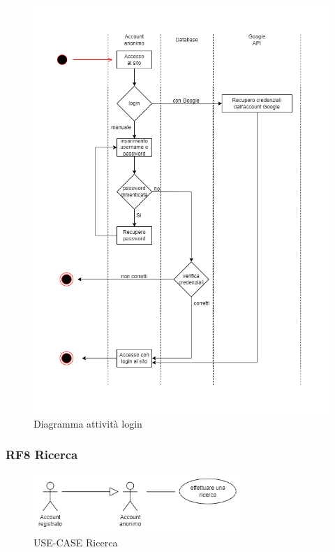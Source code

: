 \documentclass[a4paper,12pt]{article}
\begin{document}
\begin{figure}[H]
   \centering
    \includegraphics[width=1\textwidth]{img-D2/diagramma_login.png}
    \caption{ Diagramma attività login}
\end{figure}

\subsubsection*{RF8 Ricerca}
\begin{figure}[H]
   \centering
   \includegraphics[width=0.7\textwidth]{img-D2/ricerca.png}
    \caption{USE-CASE Ricerca}
\end{figure}
\end{document}
